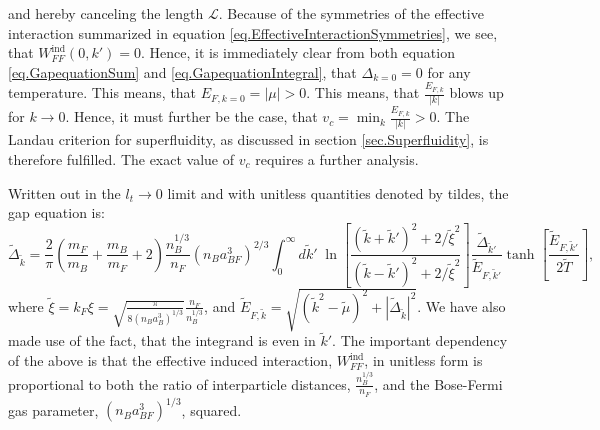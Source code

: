 and hereby canceling the length $\mathcal{L}$. Because of the symmetries of the effective interaction summarized in equation \eqref{eq.EffectiveInteractionSymmetries}, we see, that $W^\text{ind}_{FF}(0,k') = 0$. Hence, it is immediately clear from both equation \eqref{eq.GapequationSum} and \eqref{eq.GapequationIntegral}, that $\Delta_{k=0} = 0$ for any temperature. This means, that $E_{F,k=0} = |\mu| > 0$. This means, that $\frac{E_{F,k}}{|k|}$ blows up for $k\to 0$. Hence, it must further be the case, that $v_c = \min_k \frac{E_{F,k}}{|k|} > 0$. The Landau criterion for superfluidity, as discussed in section \ref{sec.Superfluidity}, is therefore fulfilled. The exact value of $v_c$ requires a further analysis. 

Written out in the $l_t \to 0$ limit and with unitless quantities denoted by tildes, the gap equation is:
\begin{equation}
\tilde{\Delta}_{\tilde{k}} = \frac{2}{\pi}\left(\frac{m_F}{m_B} + \frac{m_B}{m_F}+ 2\right)\frac{n_B^{1/3}}{n_F}(n_Ba_{BF}^3)^{2/3} \int_0^\infty d\tilde{k}' \; \ln\left[\frac{(\tilde{k}+\tilde{k}')^2+2/\tilde{\xi}^2}{(\tilde{k}-\tilde{k}')^2+2/\tilde{\xi}^2}\right] \frac{\tilde{\Delta}_{\tilde{k}'}}{\tilde{E}_{F,\tilde{k}'}}\tanh\left[\frac{\tilde{E}_{F,\tilde{k}'}}{2\tilde{T}}\right],
\label{eq.GapequationIntegralUnitless}
\end{equation} 
where $\tilde{\xi} = k_F\xi = \sqrt{ \frac{\pi}{ 8(n_Ba_B^3)^{1/3} } } \frac{n_F}{n_B^{1/3}}$, and $\tilde{E}_{F,\tilde{k}} = \sqrt{(\tilde{k}^2-\tilde{\mu})^2 + |\tilde{\Delta}_{\tilde{k}}|^2}$. We have also made use of the fact, that the integrand is even in $\tilde{k}'$. The important dependency of the above is that the effective induced interaction, $W_{FF}^\text{ind}$, in unitless form is proportional to both the ratio of interparticle distances, $\frac{n_B^{1/3}}{n_F}$, and the Bose-Fermi gas parameter, $(n_Ba_{BF}^3)^{1/3}$, squared.


